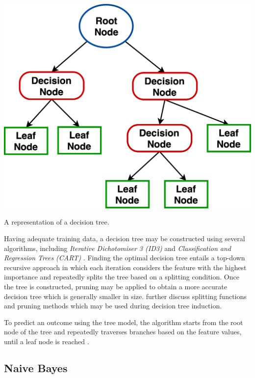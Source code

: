 \begin{marginfigure}
    \includegraphics{graphics/classification/ClassificationDecisionTree.png}
    \caption{
    A representation of a decision tree.
    }
    \label{fig:classification-decisiontree}
\end{marginfigure}
Having adequate training data, a decision tree may be constructed using several algorithms, including \textit{Iterative Dichotomiser 3 (ID3)} and \textit{Classification and Regression Trees (CART)} \citep{rokach2005}. Finding the optimal   decision tree entails a top-down recursive approach in which each iteration considers the feature with the highest importance and repeatedly splits the tree based on a splitting condition. Once the tree is constructed, pruning may be applied to obtain a more accurate decision tree which is generally smaller in size. \citet{rokach2005} further discuss splitting functions and pruning methods which may be used during decision tree induction.

To predict an outcome using the tree model, the algorithm starts from the root node of the tree and repeatedly traverses branches based on the feature values, until a leaf node is reached \citep{rokach2007}.

\subsection{Naive Bayes} 

